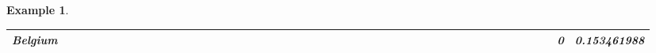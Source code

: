 \documentclass[a4paper,11pt]{report}
\newtheorem{example}[theorem]{Example}
\begin{document}
\begin{example}
\begin{appendices}
\begin{landscape}
\begin{longtable}{r|r|r|r|r|r|r|r|r|r|r|r|r|r|r|r|r|r|r|r|r|r|r|r|r|r|r|r|r|r|r|r|r|r|r|r|r|r|r|r|r|r|r|r|r|r|r|}
\multicolumn{1}{|r|}{\textbf{Belgium}}               &                                       &                                       &                                          &                                       &                                       &                                                     &                                        &                                       &                                      &                                       &                                       &                                                &                                       &                                      &                                       &                                       &                                      &                                       &                                       &                                       &                                      &                                     &                                      &                                         &                                     &                                       &                                          &                                      &                                        &                                       &                                      &                                          &                                      &                                        &                                        &                                     &                                      &                                           &                                               &                                      &                                       &                                              &                                      &                                     & 0                                             & 0.153461988                             \\ \hline

\end{longtable}
\end{landscape}
\end{appendices}
\end{example}
\end{document}
